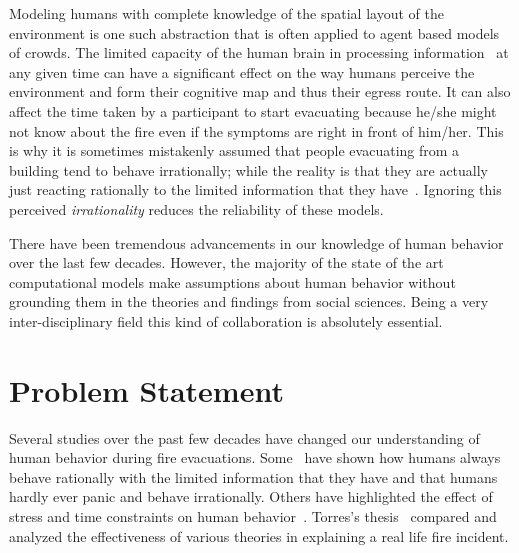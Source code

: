 Modeling humans with complete knowledge of the spatial layout of the environment is one such abstraction that is often applied to agent based models of crowds. The limited capacity of the human brain in processing information~\cite{Miller:1956tr} at any given time can have a significant effect on the way humans perceive the environment and form their cognitive map and thus their egress route. It can also affect the time taken by a participant to start evacuating because he/she might not know about the fire even if the symptoms are right in front of him/her. This is why it is sometimes mistakenly assumed that people evacuating from a building tend to behave irrationally; while the reality is that they are actually just reacting rationally to the limited information that they have~\cite{Kobes:2009jx,Schadschneider:2008cz,Reicher:2008ep,Torres:2010tj,Paulsen:1984ti,Sime:1983uy}. Ignoring this perceived \emph{irrationality} reduces the reliability of these models.







There have been tremendous advancements in our knowledge of human behavior over the last few decades. However, the majority of the state of the art computational models make assumptions about human behavior without grounding them in the theories and findings from social sciences. Being a very inter-disciplinary field this kind of collaboration is absolutely essential.

\section{Problem Statement}
\label{Intro:ProblemStatement}

Several studies over the past few decades have changed our understanding of human behavior during fire evacuations. Some~\cite{Kobes:2009jx,Schadschneider:2008cz,Reicher:2008ep,Torres:2010tj,Paulsen:1984ti,Sime:1983uy} have shown how humans always behave rationally with the limited information that they have and that humans hardly ever panic and behave irrationally. Others have highlighted the effect of stress and time constraints on human behavior~\cite{Ozel:2001tn}. Torres's thesis~\cite{Torres:2010tj} compared and analyzed the effectiveness of various theories in explaining a real life fire incident.

